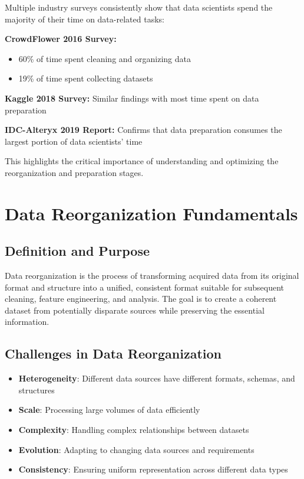 \documentclass[12pt]{article}
\begin{document}
\begin{tcolorbox}[colback=gray!10!white,colframe=gray!50!black,title={Research Findings}]
Multiple industry surveys consistently show that data scientists spend the majority of their time on data-related tasks:

\textbf{CrowdFlower 2016 Survey:}
\begin{itemize}
    \item 60\% of time spent cleaning and organizing data
    \item 19\% of time spent collecting datasets
\end{itemize}

\textbf{Kaggle 2018 Survey:} Similar findings with most time spent on data preparation

\textbf{IDC-Alteryx 2019 Report:} Confirms that data preparation consumes the largest portion of data scientists' time

This highlights the critical importance of understanding and optimizing the reorganization and preparation stages.
\end{tcolorbox}

\section{Data Reorganization Fundamentals}

\subsection{Definition and Purpose}
\begin{tcolorbox}[colback=yellow!5!white,colframe=yellow!75!black,title={Key Insight}]
Data reorganization is the process of transforming acquired data from its original format and structure into a unified, consistent format suitable for subsequent cleaning, feature engineering, and analysis. The goal is to create a coherent dataset from potentially disparate sources while preserving the essential information.
\end{tcolorbox}

\subsection{Challenges in Data Reorganization}
\begin{itemize}
    \item \textbf{Heterogeneity}: Different data sources have different formats, schemas, and structures
    \item \textbf{Scale}: Processing large volumes of data efficiently
    \item \textbf{Complexity}: Handling complex relationships between datasets
    \item \textbf{Evolution}: Adapting to changing data sources and requirements
    \item \textbf{Consistency}: Ensuring uniform representation across different data types
\end{itemize}
\end{document}
